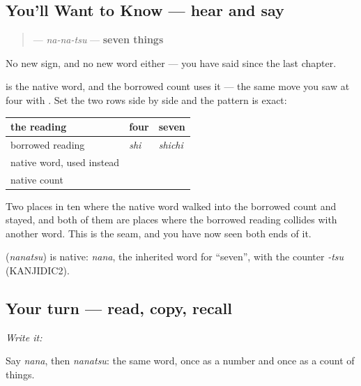 \subsection*{You'll Want to Know — hear and say}
\begin{quote}
\textbf{} — \emph{na-na-tsu} — \textbf{seven things}
\end{quote}

No new sign, and no new word either — you have said \textbf{} since the last chapter.

\begin{grammarlens}[title={Grammar Lens — the second place the seam shows}]
\textbf{} is the native word, and the borrowed count uses it — the same move you saw at four with \textbf{}. Set the two rows side by side and the pattern is exact:

\noindent
\begin{tabularx}{\linewidth}{@{}>{\raggedright\arraybackslash}X>{\raggedright\arraybackslash}X>{\raggedright\arraybackslash}X@{}}
\toprule
\textbf{the reading} & \textbf{four} & \textbf{seven} \\
\midrule
borrowed reading & \emph{shi} & \emph{shichi} \\
native word, used instead & \textbf{\ja{よん}} & \textbf{\ja{なな}} \\
native count & \textbf{\ja{よっつ}} & \textbf{\ja{ななつ}} \\
\bottomrule
\end{tabularx}

Two places in ten where the native word walked into the borrowed count and stayed, and both of them are places where the borrowed reading collides with another word. This is the seam, and you have now seen both ends of it.
\end{grammarlens}

\begin{cousinweb}
\textbf{} (\emph{nanatsu}) is native: \emph{nana}, the inherited word for \textquotedblleft{}seven\textquotedblright{}, with the counter \emph{-tsu} (KANJIDIC2).
\end{cousinweb}

\subsection*{Your turn — read, copy, recall}
\emph{Write it:} \textbf{}

Say \emph{nana}, then \emph{nanatsu}: the same word, once as a number and once as a count of things.

